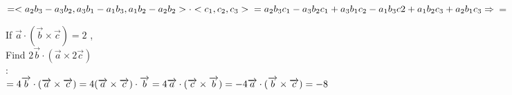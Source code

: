 $= <a_{2}b_{3} - a_{3}b_{2} , a_{3}b_{1} - a_{1}b_{3} , a_{1}b_{2} - a_{2}b_{2} > \cdot <c_{1} , c_{2}, c_{3} >\\
= a_{2}b_{3}c_{1} - a_{3}b_{2}c_{1} + a_{3}b_{1}c_{2} - a_{1}b_{3}c{2} + a_{1}b_{2}c_{3} + a_{2}b_{1}c_{3}\\
\Rightarrow$ {\color{smalt(darkpowderblue)}{L.H.S }}={\color{smalt(darkpowderblue)}{ R.H.S}} \\
\noindent{\color{smalt(darkpowderblue)}\rule{\linewidth}{.2mm}}
\begin{example}
If  $\overrightarrow{a}\cdot(\overrightarrow{b} \times \overrightarrow{c}) = 2$ ,\\ Find $2 \overrightarrow {b} \cdot (\overrightarrow{a} \times 2 \overrightarrow{c})$\\
{} : \\
$ = 4 \overrightarrow{b} \cdot (\overrightarrow{a} \times \overrightarrow{c})\\
= 4 (\overrightarrow{a} \times \overrightarrow{c}) \cdot \overrightarrow{b}\\
= 4 \overrightarrow{a} \cdot (\overrightarrow{c} \times \overrightarrow{b})\\
= -4 \overrightarrow{a} \cdot (\overrightarrow{b} \times \overrightarrow{c})\\ =-8$\end{example}
\noindent{\color{smalt(darkpowderblue)}\rule{\linewidth}{.2mm}}